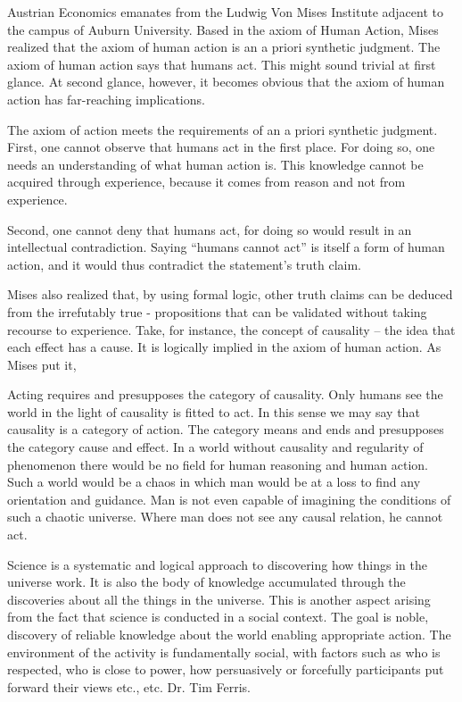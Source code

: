 Austrian Economics emanates from the Ludwig Von Mises Institute adjacent to the campus of Auburn University. Based in the axiom of Human Action, Mises realized that the axiom of human action is an a priori synthetic judgment. The axiom of human action says that humans act. This might sound trivial at first glance. At second glance, however, it becomes obvious that the axiom of human action has far-reaching implications.

The axiom of action meets the requirements of an a priori synthetic judgment. First, one cannot observe that humans act in the first place. For doing so, one needs an understanding of what human action is. This knowledge cannot be acquired through experience, because it comes from reason and not from experience.

Second, one cannot deny that humans act, for doing so would result in an intellectual contradiction. Saying ``humans cannot act'' is itself a form of human action, and it would thus contradict the statement’s truth claim.

Mises also realized that, by using formal logic, other truth claims can be deduced from the irrefutably true - propositions that can be validated without taking recourse to experience. Take, for instance, the concept of causality – the idea that each effect has a cause. It is logically implied in the axiom of human action. As Mises put it,

Acting requires and presupposes the category of causality. Only humans see the world in the light of causality is fitted to act. In this sense we may say that causality is a category of action. The category means and ends and presupposes the category cause and effect. In a world without causality and regularity of phenomenon there would be no field for human reasoning and human action. Such a world would be a chaos in which man would be at a loss to find any orientation and guidance. Man is not even capable of imagining the conditions of such a chaotic universe. Where man does not see any causal relation, he cannot act.

Science is a systematic and logical approach to discovering how things in the universe work. It is also the body of knowledge accumulated through the discoveries about all the things in the universe. This is another aspect arising from the fact that science is conducted in a social context. The goal is noble, discovery of reliable knowledge about the world enabling appropriate action. The environment of the activity is fundamentally social, with factors such as who is respected, who is close to power, how persuasively or forcefully participants put forward their views etc., etc. Dr. Tim Ferris.

